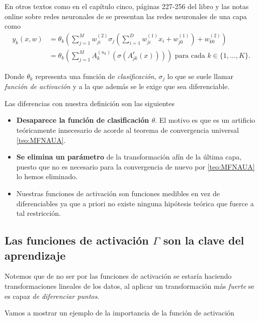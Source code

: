 En otros textos como en el capítulo cinco, páginas 227-256 del libro \cite{BishopPaterRecognition} y las notas online sobre redes neuronales de \cite{MostafaLearningFromData} se presentan las redes neuronales de una capa como 
\begin{align}
    y_k(x,w) &= \theta_k 
    \left( 
        \sum^M_{j=1} w_{ji}^{(2)}
        \sigma_j 
        \left(
            \sum_{i=1}^D w_{ji}^{(1)} x_i + w_{j0}^{(1)}
        \right)
        + w_{k0}^{(2)}
    \right) 
    \\
    & = 
    \theta_k 
    \left( 
        \sum^M_{j=1} A^{(n_k)}_{k}
        \left(
            \sigma 
            \left(
                A^{r}_{j k}
                \left(
                    x
                \right)
            \right)
        \right)
    \right)
    \text{ para cada  } k \in \{1, \ldots, K \}.
\end{align}

Donde $\theta_k$ representa una función de \textit{clasificación}, 
$\sigma_j$ lo que se suele llamar \textit{función de activación} y a la que además se le exige que sea diferenciable.

Las diferencias con nuestra definición son las siguientes 
\begin{itemize}
    \item \textbf{Desaparece la función de clasificación $\theta$}. El motivo es que es un artificio teóricamente innecesario de acorde al teorema de convergencia universal \ref{teo:MFNAUA}.
    \item \textbf{Se elimina un parámetro} de la transformación afín de la última capa, puesto que no es necesario para la convergencia de nuevo por \ref{teo:MFNAUA} lo hemos eliminado.
    \item Nuestras funciones de activación son funciones medibles en vez de diferenciables ya que a priori no existe ninguna hipótesis teórica que fuerce a tal restricción.
\end{itemize}

\subsection*{Las funciones de activación $\Gamma$ son la clave del aprendizaje}  

Notemos que de no ser por las funciones de activación se estaría haciendo transformaciones lineales de los datos, al aplicar un transformación más \textit{fuerte} se es capaz \textit{de diferenciar puntos}.

Vamos a mostrar un ejemplo de la importancia de la función de activación 

